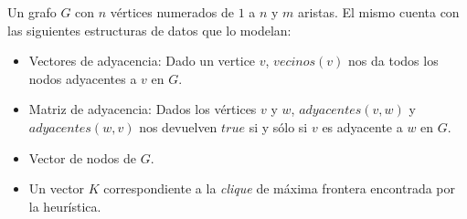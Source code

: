 \bigskip

\begin{pseudocodigo}
    \Require Un grafo $G$ con $n$ v\'ertices numerados de $1$ a $n$ y $m$ aristas. El mismo
        cuenta con las siguientes estructuras de datos que lo modelan:
        \begin{itemize}
            \item Vectores de adyacencia: Dado un vertice $v$, $vecinos(v)$ nos da todos los
                nodos adyacentes a $v$ en $G$.

            \item Matriz de adyacencia: Dados los v\'ertices $v$ y $w$, $adyacentes(v,w)$ y
                $adyacentes(w,v)$ nos devuelven $true$ si y s\'olo si $v$ es adyacente
                a $w$ en $G$.

            \item Vector de nodos de $G$.
        \end{itemize}
    \Ensure\Statex
        \begin{itemize}
            \item Un vector $K$ correspondiente a la \emph{clique} de m\'axima frontera
                encontrada por la heur\'istica.


\end{itemize}
\end{pseudocodigo}
